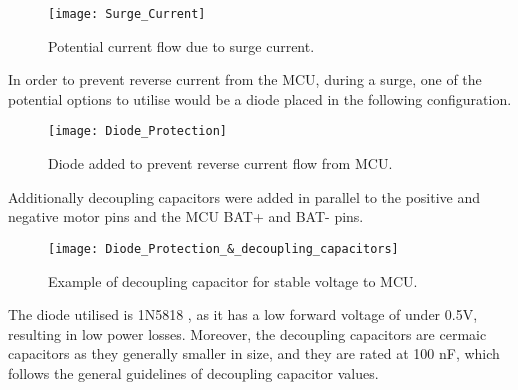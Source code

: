 \documentclass[12pt]{article}
\begin{document}
\begin{figure}[H]
    \begin{center}
    \texttt{[image: Surge\_Current]}
    \end{center}
    \caption{Potential current flow due to surge current.}
    \label{fig:Surge_Current}
\end{figure}

In order to prevent reverse current from the MCU, 
during a surge, one of the potential options to 
utilise would be a diode placed in the following 
configuration. 

\begin{figure}[H]
    \begin{center}
    \texttt{[image: Diode\_Protection]}
    \end{center}
    \caption{Diode added to prevent reverse current flow from MCU.}
    \label{fig:Diode_Protection}
\end{figure}

Additionally decoupling capacitors were added in 
parallel to the positive and negative motor pins 
and the MCU BAT+ and BAT- pins.


\begin{figure}[H]
    \begin{center}
    \texttt{[image: Diode\_Protection\_\&\_decoupling\_capacitors]}
    \end{center}
    \caption{Example of decoupling capacitor for stable voltage to MCU.}
    \label{fig:Diode_Protection_&_decoupling_capacitors}
\end{figure}

The diode utilised is 1N5818 \cite{1N5818}, as it has a low 
forward voltage of under 0.5V, resulting in low 
power losses. Moreover, the decoupling capacitors
are cermaic capacitors as they generally smaller
in size, and they are rated at 100 nF, which follows 
the general guidelines of decoupling capacitor values.
\cite{DecouplingCap}



\end{document}
